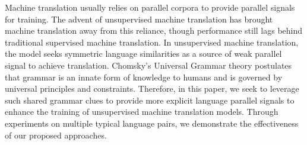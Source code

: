 Machine translation usually relies on parallel corpora to provide parallel signals for training. The advent of unsupervised machine translation has brought machine translation away from this reliance, though performance still lags behind traditional supervised machine translation. In unsupervised machine translation, the model seeks symmetric language similarities as a source of weak parallel signal to achieve translation. Chomsky's Universal Grammar theory postulates that grammar is an innate form of knowledge to humans and is governed by universal principles and constraints. Therefore, in this paper, we seek to leverage such shared grammar clues to provide more explicit language parallel signals to enhance the training of unsupervised machine translation models. Through experiments on multiple typical language pairs, we demonstrate the effectiveness of our proposed approaches.
